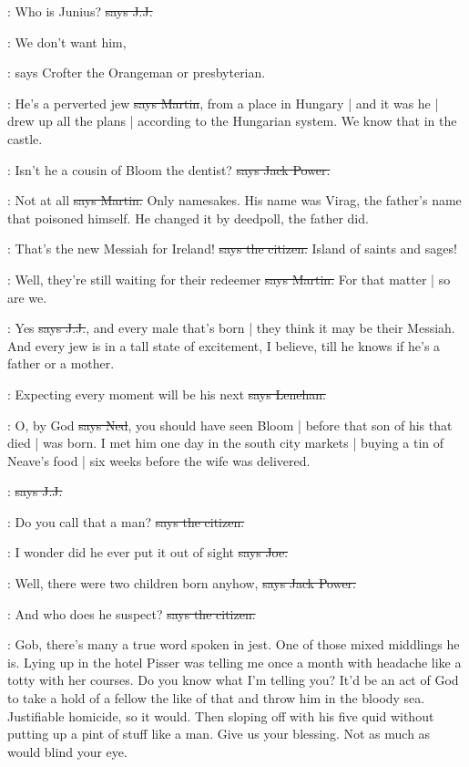 \jjom:
Who is Junius?
\sout{says J.J.}

\crofton:
We don't want him,

\Nq:
says Crofter the Orangeman or presbyterian.

\cunningham:
He's a perverted jew
\sout{says Martin},
from a place in Hungary |
and it was he |
drew up all the plans |
according to the Hungarian system.
We know that in the castle.

\power:
Isn't he a cousin of Bloom the dentist?
\sout{says Jack Power.}

\cunningham:
Not at all
\sout{says Martin.}
Only namesakes.
His name was Virag,
the father's name that poisoned himself.
He changed it by deedpoll,
the father did.

\citizen:
That's the new Messiah for Ireland!
\sout{says the citizen.}
Island of saints and sages!

\cunningham:
Well,
they're still waiting for their redeemer
\sout{says Martin.}
For that matter |
so are we.

\jjom:
Yes
\sout{says J.J.},
and every male that's born |
they think it may be their Messiah.
And every jew is in a tall state of excitement,
I believe,
till he knows if he's a father or a mother.

\lenehan:
Expecting every moment will be his next
\sout{says Lenehan.}

\lambert:
O,
by God
\sout{says Ned},
you should have seen Bloom |
before that son of his that died |
was born.
I met him one day in the south city markets |
buying a tin of Neave's food |
six weeks before the wife was delivered.

\jjom:
\sout{says J.J.}

\citizen:
Do you call that a man?
\sout{says the citizen.}

\joe:
I wonder did he ever put it out of sight
\sout{says Joe.}

\power:
Well,
there were two children born anyhow,
\sout{says Jack Power.}

\citizen:
And who does he suspect?
\sout{says the citizen.}

\Nq:
Gob,
there's many a true word spoken in jest.
One of those mixed middlings he is.
Lying up in the hotel
Pisser was telling me
once a month with headache
like a totty with her courses.
Do you know what I'm telling you?
It'd be an act of God to take a hold of a fellow the like of that
and throw him in the bloody sea.
Justifiable homicide,
so it would.
Then sloping off with his five quid without putting up a pint of stuff like a man.
Give us your blessing.
Not as much as would blind your eye.

